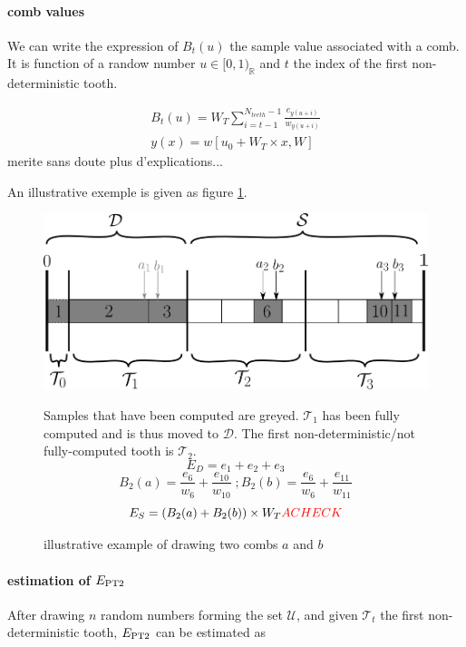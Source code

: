 \documentclass[./thesis.tex]{subfiles}
\begin{document}
\paragraph{comb values}

We can write the expression of $B_t(u)$ the sample value associated with a comb. It is function of a randow number $u \in [0,1)_\mathbb{R}$ and $t$ the index of the first non-deterministic tooth.

\begin{align}
\label{eq:combvalue}
B_t(u) = W_T \sum_{i=t-1}^{N_{teeth}-1} \frac{e_{y(u+i)}}{w_{y(u+i)}} \\
y(x)=w[u_0+ W_T \times x, W]
\end{align}
\alert{merite sans doute plus d'explications...}

An illustrative exemple is given as figure \ref{fig:toothindet}.

 \begin{figure}[h!]
	\begin{center}
		\includegraphics[width=0.9\columnwidth]{figures/pt2/toothindet}
		\caption{illustrative example of drawing two combs $a$ and $b$}
		\label{fig:toothindet}
		Samples that have been computed are greyed. $\mathcal{T}_1$ has been fully computed and is thus moved to $\mathcal{D}$. The first non-deterministic/not fully-computed tooth is $\mathcal{T}_2$.
		$$E_D = e_1 + e_2 + e_3$$
		$$B_2(a) = \frac{e_6}{w_6} + \frac{e_{10}}{w_{10}}\;;B_2(b) = \frac{e_6}{w_6} + \frac{e_{11}}{w_{11}}$$
		$$E_S = (B_2(a)+B_2(b)) \times W_T \textcolor{red}{A CHECK}$$
	\end{center}
\end{figure}

\paragraph{estimation of $E_\text{PT2}$}

After drawing $n$ random numbers forming the set $\mathcal{U}$, and given $\mathcal{T}_t$ the first non-deterministic tooth, $E_\text{PT2}$ can be estimated as 
\end{document}
